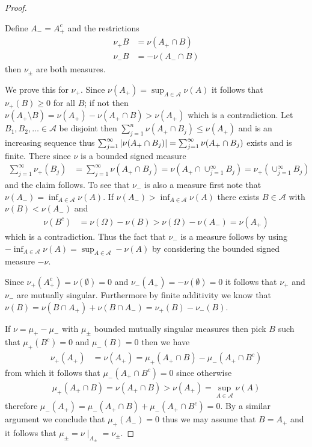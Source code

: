 \begin{proof}
\begin{clm}Define $A_- =
A_+^c$ and the restrictions 
\begin{align*}
\nu_+ B &= \nu (A_+ \cap B ) \\
\nu_- B &= -\nu ( A_- \cap B )
\end{align*}
then $\nu_\pm$ are both measures.
\end{clm}
We prove this for $\nu_+$.  Since $\nu(A_+) = \sup_{A \in \mathcal{A}} \nu(A)$ it follows that $\nu_+(B) \geq 0$ for all $B$; if not then $\nu(A_+ \setminus B) = \nu(A_+) - \nu(A_+ \cap B) > \nu(A_+)$ which is a contradiction.  Let $B_1, B_2, \dotsc \in \mathcal{A}$ be disjoint then $\sum_{j=1}^n \nu(A_+ \cap B_j) \leq \nu(A_+)$ and is an increasing sequence thus $\sum_{j=1}^\infty \left \vert \nu(A_+ \cap B_j) \right \vert = \sum_{j=1}^\infty \nu(A_+ \cap B_j)$ exists and is finite.  There since $\nu$ is a bounded signed measure
\begin{align*}
\sum_{j=1}^\infty \nu_+(B_j) &= \sum_{j=1}^\infty \nu(A_+ \cap B_j) = \nu(A_+ \cap \cup_{j=1}^\infty  B_j) = \nu_+(\cup_{j=1}^\infty  B_j)
\end{align*}
and the claim follows.  To see that $\nu_-$ is also a measure first note that $\nu(A_-) = \inf_{A \in \mathcal{A}} \nu(A)$.  If $\nu(A_-) > \inf_{A \in \mathcal{A}} \nu(A)$ there exists $B \in \mathcal{A}$ with $\nu(B) < \nu(A_-)$ and 
\begin{align*}
\nu(B^c) &= \nu(\Omega) - \nu(B) > \nu(\Omega) - \nu(A_-) = \nu(A_+)
\end{align*}
which is a contradiction.  Thus the fact that $\nu_-$ is a measure follows by using $-\inf_{A \in \mathcal{A}} \nu(A) = \sup_{A \in \mathcal{A}} - \nu(A)$ 
by considering the bounded signed measure $-\nu$.

Since $\nu_+(A_+^c) = \nu(\emptyset) = 0$ and $\nu_-(A_+) = -\nu ( \emptyset ) = 0$ it follows that $\nu_+$ and $\nu_-$ are mutually singular.  Furthermore by finite additivity we know that $\nu(B) = \nu(B \cap A_+) + \nu(B \cap A_-) = \nu_+(B) - \nu_-(B)$.

If $\nu = \mu_+ - \mu_-$ with $\mu_\pm$ bounded mutually singular measures then pick $B$ such that $\mu_+(B^c) = 0$ and $\mu_-(B) = 0$ then we have
\begin{align*}
\nu_+(A_+) &= \nu(A_+) = \mu_+(A_+ \cap B) - \mu_-(A_+ \cap B^c)
\end{align*}
from which it follows that $\mu_-(A_+ \cap B^c)=0$ since otherwise 
\begin{align*}
\mu_+(A_+ \cap B) = \nu(A_+ \cap B) > \nu(A_+) = \sup_{A \in \mathcal{A}} \nu(A)
\end{align*}
therefore $\mu_-(A_+) = \mu_-(A_+ \cap B) + \mu_-(A_+\cap B^c) = 0$.  By a similar argument we conclude that $\mu_+(A_-) = 0$ thus we may assume that $B=A_+$ and it follows that $\mu_\pm = \nu \mid_{A_\pm} = \nu_\pm$.
\end{proof}

